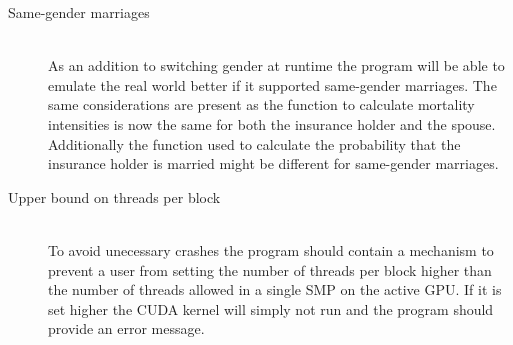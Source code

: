 \begin{description}
\item[Same-gender marriages] \hfill \\
As an addition to switching gender at runtime the program will be able to emulate the real world better if it supported same-gender marriages. The same considerations are present as the function to calculate mortality intensities is now the same for both the insurance holder and the spouse. Additionally the function used to calculate the probability that the insurance holder is married might be different for same-gender marriages. \\

\item[Upper bound on threads per block] \hfill \\
To avoid unecessary crashes the program should contain a mechanism to prevent a user from setting the number of threads per block higher than the number of threads allowed in a single SMP on the active GPU. If it is set higher the CUDA kernel will simply not run and the program should provide an error message.

\end{description}
